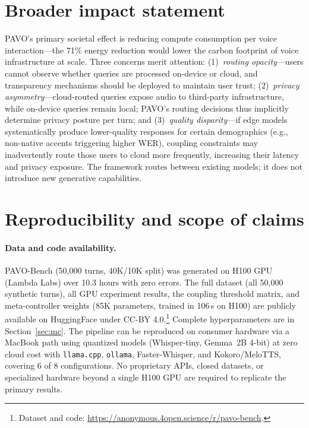 \documentclass{article}
\begin{document}
\section{Broader impact statement}
\label{sec:broader_impact}

PAVO's primary societal effect is reducing compute consumption per voice interaction---the 71\% energy reduction would lower the carbon footprint of voice infrastructure at scale. Three concerns merit attention: (1)~\emph{routing opacity}---users cannot observe whether queries are processed on-device or cloud, and transparency mechanisms should be deployed to maintain user trust; (2)~\emph{privacy asymmetry}---cloud-routed queries expose audio to third-party infrastructure, while on-device queries remain local; PAVO's routing decisions thus implicitly determine privacy posture per turn; and (3)~\emph{quality disparity}---if edge models systematically produce lower-quality responses for certain demographics (e.g., non-native accents triggering higher WER), coupling constraints may inadvertently route those users to cloud more frequently, increasing their latency and privacy exposure. The framework routes between existing models; it does not introduce new generative capabilities.

\section{Reproducibility and scope of claims}
\label{sec:reproducibility}
\label{sec:scope}

\paragraph{Data and code availability.}
PAVO-Bench (50{,}000 turns, 40K/10K split) was generated on H100 GPU (Lambda Labs) over 10.3 hours with zero errors. The full dataset (all 50{,}000 synthetic turns), all GPU experiment results, the coupling threshold matrix, and meta-controller weights (85K parameters, trained in 106\,s on H100) are publicly available on HuggingFace under CC-BY 4.0.\footnote{Dataset and code: \url{https://anonymous.4open.science/r/pavo-bench}.} Complete hyperparameters are in Section~\ref{sec:mc}. The pipeline can be reproduced on consumer hardware via a MacBook path using quantized models (Whisper-tiny, Gemma~2B 4-bit) at zero cloud cost with \texttt{llama.cpp}, \texttt{ollama}, Faster-Whisper, and Kokoro/MeloTTS, covering 6 of 8 configurations. No proprietary APIs, closed datasets, or specialized hardware beyond a single H100 GPU are required to replicate the primary results.
\end{document}
